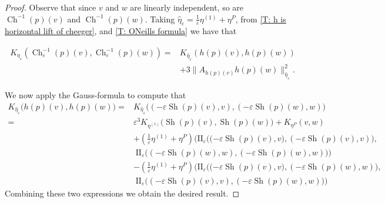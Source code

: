 \documentclass[12pt,a4paper,reqno]{amsart}
\DeclareMathOperator{\Ch}{Ch}
\DeclareMathOperator{\Sh}{Sh} %
\newcommand{\1}{\mathbbm{1}} %
\newcommand{\II}{\mathrm{II}} %
\theoremstyle{definition}
\theoremstyle{TheoremNum}
\begin{document}
\begin{proof}
Observe that since $v$ and $w$ are linearly independent, so are $\Ch^{-1}(p)(v)$ and $\Ch^{-1}(p)(w)$. Taking $\widehat{\eta}_\varepsilon = \frac{1}{\varepsilon}\eta^{(1)}+\eta^{P}$, from \th\ref{T: h is horizontal lift of cheeger}, and \th\ref{T: ONeills formula} we have that 
\begin{linenomath}
\begin{align*}
K_{\eta_\varepsilon}(\Ch^{-1}_\varepsilon(p)(v),\Ch^{-1}_\varepsilon(p)(w)) =& K_{\widehat{\eta}_\varepsilon}(h(p)(v),h(p)(w))\\ 
&+ 3\|A_{h(p)(v)} h(p)(w)\|^2_{\widehat{\eta}_\varepsilon}.
\end{align*}
\end{linenomath}
We now apply the Gauss-formula to compute that
\begin{align*}
K_{\widehat{\eta}_\varepsilon}\big(h(p)(v),h(p)(w)\big)=&K_{\widehat{\eta}_\varepsilon}\big((-\varepsilon \Sh(p)(v),v),(-\varepsilon \Sh(p)(w),w)\big)\\
=&\varepsilon^3 K_{\eta^{(1)}}\big(\Sh(p)(v),\Sh(p)(w)\big)+K_{\eta^{P}}(v,w)\\
&+\left(\frac{1}{\varepsilon}\eta^{(1)}+\eta^{P}\right)\bigg(\II_\varepsilon\big((-\varepsilon\Sh(p)(v),v\big),(-\varepsilon\Sh(p)(v),v)\big),\\
&\;\II_\varepsilon\big((-\varepsilon\Sh(p)(w),w),(-\varepsilon\Sh(p)(w),w)\big)\bigg)\\
&-\left(\frac{1}{\varepsilon}\eta^{(1)}+\eta^{P}\right)\bigg(\II_\varepsilon\big((-\varepsilon\Sh(p)(v),v\big),(-\varepsilon\Sh(p)(w),w)\big),\\
&\;\II_\varepsilon\big((-\varepsilon\Sh(p)(v),v),(-\varepsilon\Sh(p)(w),w)\big)\bigg)
\end{align*}
Combining these two expressions we obtain the desired result.
\end{proof}



\end{document}
